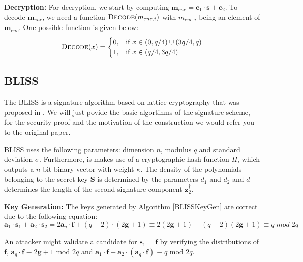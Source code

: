 \textbf{Decryption:} For decryption, we start by computing \(\textbf{m}_{enc} = \textbf{c}_1 \cdot \textbf{s} + \textbf{c}_2\). To decode \(\textbf{m}_{enc}\), we need a function \(\textsc{Decode}(m_{enc,i})\) with \(m_{enc,i}\) being an element of \(\textbf{m}_{enc}\). One possible function is given below:
\begin{equation}
    \textsc{Decode}(x)=\begin{cases}
        0, & \text{if }x \in (0,q/4) \cup (3q/4,q)\\
        1, & \text{if }x \in (q/4,3q/4)
    \end{cases}
\end{equation}

\subsection{BLISS}
The \acf{BLISS} is a signature algorithm based on lattice cryptography that was proposed in \cite{bliss}. We will just povide the basic algortihms of the signature scheme, for the security proof and the motivation of the construction we would refer you to the original paper.

\ac{BLISS} uses the following parameters: dimension \(n\), modulus \(q\) and standard deviation \(\sigma\). Furthermore, is makes use of a cryptographic hash function \(H\), which outputs a \(n\) bit binary vector with weight \(\kappa\). The density of the polynomials belonging to the secret key \(\textbf{S}\) is determined by the parameters \(d_1\) and \(d_2\) and \(d\) determines the length of the second signature component \(\textbf{z}_2^\dagger\).

\textbf{Key Generation:} The keys generated by Algorithm \ref{BLISSKeyGen} are correct due to the following equation:
\begin{equation}
    \textbf{a}_1 \cdot \textbf{s}_1 + \textbf{a}_2 \cdot \textbf{s}_2 = 2 \textbf{a}_q \cdot \textbf{f} + (q - 2) \cdot (2 \textbf{g} + 1) \equiv 2 (2 \textbf{g} + 1) + (q - 2) (2 \textbf{g} + 1) \equiv q \; mod \; 2q
\end{equation}

An attacker might validate a candidate for \(\textbf{s}_1 = \textbf{f}\) by verifying the distributions of \(\textbf{f}\), \(\textbf{a}_q \cdot \textbf{f} \equiv 2 \textbf{g} + 1\) mod \(2q\) and \(\textbf{a}_1 \cdot \textbf{f} + \textbf{a}_2 \cdot (\textbf{a}_q \cdot \textbf{f}) \equiv q\) mod \(2q\).

